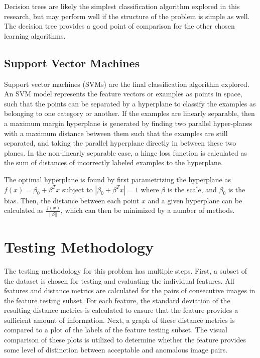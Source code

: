 Decision trees are likely the simplest classification algorithm explored in this research, but may perform well if the structure of the problem is simple as well.
The decision tree provides a good point of comparison for the other chosen learning algorithms.



\subsection{Support Vector Machines}

Support vector machines (SVMs) are the final classification algorithm explored.
An SVM model represents the feature vectors or examples as points in space, such that the points can be separated by a hyperplane to classify the examples as belonging to one category or another.
If the examples are linearly separable, then a maximum margin hyperplane is generated by finding two parallel hyper-planes with a maximum distance between them such that the examples are still separated, and taking the parallel hyperplane directly in between these two planes.
In the non-linearly separable case, a hinge loss function is calculated as the sum of distances of incorrectly labeled examples to the hyperplane.

The optimal hyperplane is found by first parametrizing the hyperplane as $f(x) = \beta_0 + \beta^Tx$ subject to $|\beta_0 + \beta^Tx| =1$ where $\beta$ is the scale, and $\beta_0$ is the bias.
Then, the distance between each point $x$ and a given hyperplane can be calculated as $\frac{f(x)}{||\beta||}$, which can then be minimized by a number of methods.



\section{Testing Methodology}

The testing methodology for this problem has multiple steps.
First, a subset of the dataset is chosen for testing and evaluating the individual features.
All features and distance metrics are calculated for the pairs of consecutive images in the feature testing subset.
For each feature, the standard deviation of the resulting distance metrics is calculated to ensure that the feature provides a sufficient amount of information.
Next, a graph of these distance metrics is compared to a plot of the labels of the feature testing subset.
The visual comparison of these plots is utilized to determine whether the feature provides some level of distinction between acceptable and anomalous image pairs.


